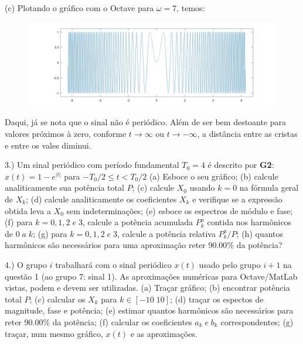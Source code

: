 \documentclass{article}
\begin{document}
(c) Plotando o gráfico com o Octave para $\omega = 7$, temos:
\begin{figure}[h]
    \includegraphics[scale=0.3]{plotq2c}
    \centering
\end{figure}

Daqui, já se nota que o sinal não é periódico. Além de ser bem destoante para valores próximos à zero, conforme $t \rightarrow \infty$ ou $t \rightarrow - \infty$, a distância entre as cristas e entre os vales diminui.

\vspace{\baselineskip}

3.) Um sinal periódico com período fundamental $T_{0} = 4 $ é descrito por \textbf{G2}: $x(t) = 1 - e^{|t|}$ para $-T_{0}/2 \leq t < T_{0} / 2$
(a) Esboce o seu gráfico;
(b) calcule analiticamente sua potência total $P$;
(c) calcule $X_{0}$ usando $k = 0$ na fórmula geral de $X_{k}$;
(d) calcule analiticamente os coeficientes $X_{k}$ e verifique se a expressão obtida leva a $X_{0}$ sem indeterminações;
(e) esboce os espectros de módulo e fase;
(f) para $k = 0, 1, 2\;e\;3$, calcule a potência acumulada $P_{k}^{a}$ contida nos harmônicos de $0\;a\;k$;
(g) para $k = 0, 1, 2\;e\;3$, calcule a potência relativa $P_{k}^{a}/P$;
(h) quantos harmônicos são necessários para uma aproximação reter $90.00\%$ da potência?

\vspace{\baselineskip}

4.) O grupo $i$ trabalhará com o sinal periódico $x(t)$ usado pelo grupo $i + 1$ na questão 1 (ao grupo 7: sinal 1). As aproximações numéricas para Octave/MatLab vistas, podem e devem ser utilizadas.
(a) Traçar gráfico;
(b) encontrar potência total $P$;
(c) calcular os $X_{k}$ para $k \in [-10\;10]$;
(d) traçar os espectos de magnitude, fase e potência;
(e) estimar quantos harmônicos são necessários para reter $90.00\%$ da potência;
(f) calcular os coeficientes $a_{k}\;e\;b_{k}$ correspondentes;
(g) traçar, num mesmo gráfico, $x(t)$ e as aproximações.

\vspace{\baselineskip}
\end{document}
